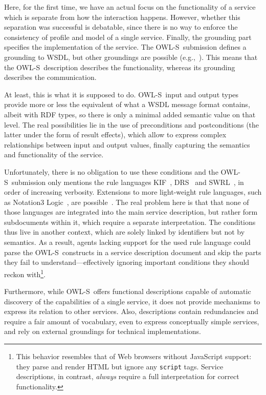 \documentclass[runningheads,a4paper, twocolumn]{llncs}
\newcommand{\owls}{\mbox{OWL-S}}
\begin{document}
Here, for the first time, we have an actual focus on the functionality of a service which is separate from how the interaction happens. However, whether this separation was successful is debatable, since there is no way to enforce the consistency of profile and model of a single service. Finally, the grounding part specifies the implementation of the service. The \owls\ submission defines a grounding to WSDL, but other groundings are possible (e.g.,~\cite{Verborgh:2010p2746}). This means that the \owls\ description describes the functionality, whereas its grounding describes the communication.

At least, this is what it is supposed to do. \owls\ input and output types provide more or less the equivalent of what a WSDL message format contains, albeit with RDF types, so there is only a minimal added semantic value on that level. The real possibilities lie in the use of preconditions and postconditions (the latter under the form of result effects), which allow to express complex relationships between input and output values, finally capturing the semantics and functionality of the service.

Unfortunately, there is no obligation to use these conditions and the \owls\ submission only mentions the rule languages KIF~\cite{KIF}, DRS~\cite{DRS} and SWRL~\cite{SWRL}, in order of increasing verbosity. Extensions to more light-weight rule languages, such as Notation3 Logic~\cite{N3Logic}, are possible~\cite{Verborgh:2010p2746}. The real problem here is that that none of those languages are integrated into the main service description, but rather form subdocuments within it, which require a separate interpretation. The conditions thus live in another context, which are solely linked by identifiers but not by semantics. As a result, agents lacking support for the used rule language could parse the \owls\ constructs in a service description document and skip the parts they fail to understand---effectively ignoring important conditions they should reckon with\footnote{This behavior resembles that of Web browsers without JavaScript support: they parse and render HTML but ignore any \Verb!script! tags. Service descriptions, in contrast, {\em always} require a full interpretation for correct functionality.}.

Furthermore, while \owls\ offers functional descriptions capable of automatic discovery of the capabilities of a single service, it does not provide mechanisms to express its relation to other services. Also, descriptions contain redundancies and require a fair amount of vocabulary, even to express conceptually simple services, and rely on external groundings for technical implementations.
\end{document}
